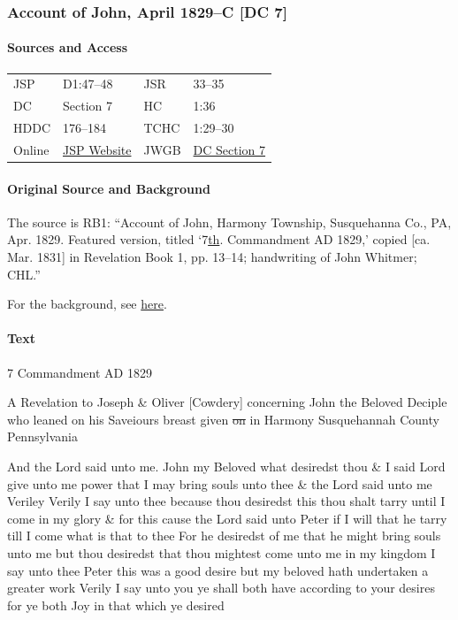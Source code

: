 		\subsubsection{Account of John, April 1829--C [DC 7]}
			\label{EMS-1828-1829-JS-APR-1829-C}
			
			\paragraph{Sources and Access}

				\begin{tabular}{p{1in}p{1.5in}p{1in}p{1.5in}}
				JSP	 	& D1:47--48		& JSR 		& 33--35	 \\  
				DC	 	& Section 7 	& HC 		& 1:36		 \\
				HDDC 	& 176--184 		& TCHC 		& 1:29--30	 \\
				Online  & \href{https://www.josephsmithpapers.org/paper-summary/account-of-john-april-1829-c-dc-7/1}{JSP Website} & 
				JWGB	& \hyperref[DC7]{DC Section 7} \\
				\end{tabular}
				
			\paragraph{Original Source and Background}
			
				The source is RB1: ``Account of John, Harmony Township, Susquehanna Co., PA, Apr. 1829. Featured version, titled `7{\uline{th}.} Commandment AD 1829,' copied [ca. Mar. 1831] in Revelation Book 1, pp. 13--14; handwriting of John Whitmer; CHL.''
				
				For the background, see \hyperref[DC7-HB]{here}.
			
			\paragraph{Text}
			
				\begin{tightcenter}
				7 Commandment AD 1829
				\end{tightcenter}
				
				A Revelation to Joseph \& Oliver [Cowdery] concerning John the Beloved Deciple who leaned on his Saveiours breast given \sout{on} in Harmony Susquehannah County Pennsylvania
				
				And the Lord said unto me. John my Beloved what desiredst thou \& I said Lord give unto me power that I may bring souls unto thee \& the Lord said unto me Veriley Verily I say unto thee because thou desiredst this thou shalt tarry until I come in my glory \& for this cause the Lord said unto Peter if I will that he tarry till I come what is that to thee For he desiredst of me that he might bring souls unto me but thou desiredst that thou mightest come unto me in my kingdom I say unto thee Peter this was a good desire but my beloved hath undertaken a greater work Verily I say unto you ye shall both have according to your desires for ye both Joy in that which ye desired
			
